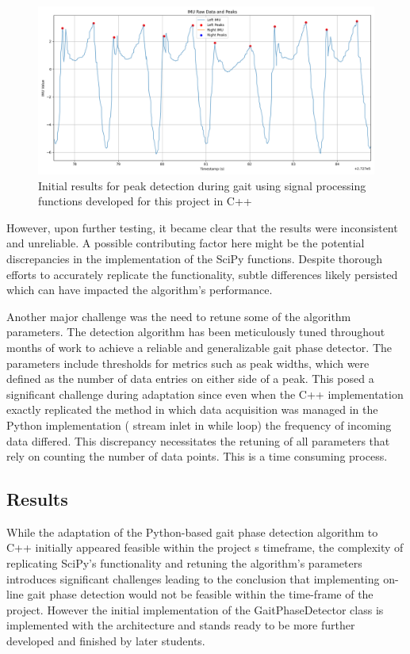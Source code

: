 \begin{figure}
    \centering
    \includegraphics[width=0.95\linewidth]{images/peaks_wz_13.12.24.png}
    \caption{Initial results for peak detection during gait using signal processing functions developed for this project in C++}
    \label{fig:peaks}
\end{figure}

However, upon further testing, it became clear that the results were inconsistent and unreliable. A possible contributing factor here might be the potential discrepancies in the implementation of the SciPy functions. Despite thorough efforts to accurately replicate the functionality, subtle differences likely persisted which can have impacted the algorithm's performance. 

Another major challenge was the need to retune some of the algorithm parameters. The detection algorithm has been meticulously tuned throughout months of work to achieve a reliable and generalizable gait phase detector. The parameters include thresholds for metrics such as peak widths, which were defined as the number of data entries on either side of a peak. This posed  a significant challenge during adaptation since even when the C++ implementation exactly replicated the method in which data acquisition was managed in the Python implementation ( stream inlet in while loop) the frequency of incoming data differed. This discrepancy necessitates the retuning of all parameters that rely on counting the number of data points. This is a time consuming process. 

\subsection{Results}
While the adaptation of the Python-based gait phase detection algorithm to C++ initially appeared feasible within the project
s timeframe, the complexity of replicating SciPy's functionality and retuning the algorithm's parameters introduces significant challenges leading to the conclusion that implementing on-line gait phase detection would not be feasible within the time-frame of the project. However the initial implementation of the GaitPhaseDetector class is implemented with the architecture and stands ready to be more further developed and finished by later students.



